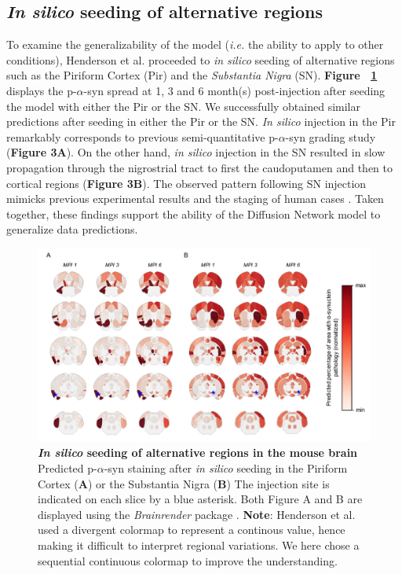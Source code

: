 \subsection{\textit{In silico} seeding of alternative regions}
To examine the generalizability of the model (\textit{i.e.} the ability to apply to other conditions), Henderson et al. proceeded to \textit{in silico} seeding of alternative regions such as the Piriform Cortex (Pir) and the \textit{Substantia Nigra} (SN). \textbf{Figure ~\ref{fig:fig3}} displays the p-$\alpha$-syn spread at 1, 3 and 6 month(s) post-injection after seeding the model with either the Pir or the SN. We successfully obtained similar predictions after seeding in either the Pir or the SN. \textit{In silico} injection in the Pir remarkably corresponds to previous semi-quantitative p-$\alpha$-syn grading study \cite{Rey_2016} (\textbf{Figure 3A}). On the other hand, \textit{in silico} injection in the SN resulted in slow propagation through the nigrostrial tract to first the caudoputamen and then to cortical regions (\textbf{Figure 3B}). The observed pattern following SN injection mimicks previous experimental results and the staging of human cases \cite{Braak_2003, Recasens_2014,  Bourdenx_2020}. Taken together, these findings support the ability of the Diffusion Network model to generalize data predictions.

\begin{figure}[!h]
    \includegraphics[width=\linewidth]{Figures/Fig3.pdf}

    \caption{\textbf{\textit{In silico} seeding of alternative regions in the mouse brain} 
    Predicted p-$\alpha$-syn staining after \textit{in silico} seeding in the Piriform Cortex (\textbf{A}) or the Substantia Nigra (\textbf{B}) The injection site is indicated on each slice by a blue asterisk. Both Figure A and B are displayed using the \textit{Brainrender} package \cite{Claudi_2021}. \textbf{Note}: Henderson et al. used a divergent colormap to represent a continous value, hence making it difficult to interpret regional variations. We here chose a sequential continuous colormap to improve the understanding.}
    \label{fig:fig3}
\end{figure}
    
